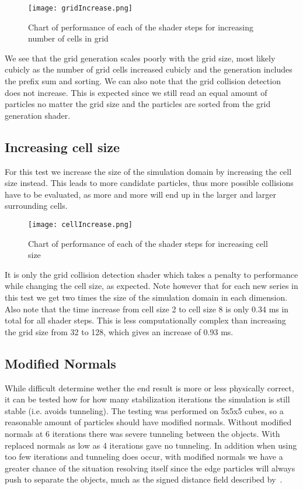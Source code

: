 \begin{figure}[H]
  \centering
  \texttt{[image: gridIncrease.png]}
  \caption{Chart of performance of each of the shader steps for increasing number of cells in grid}
\end{figure}

We see that the grid generation scales poorly with the grid size, most likely cubicly
as the number of grid cells increased cubicly and the generation includes the prefix sum and sorting.
We can also note that the grid collision detection does not increase. This is expected since
we still read an equal amount of particles no matter the grid size and the particles are
sorted from the grid generation shader.

\subsection{Increasing cell size}
For this test we increase the size of the simulation domain by increasing the cell size instead.
This leads to more candidate particles, thus more possible collisions have to be evaluated,
as more and more will end up in
the larger and larger surrounding cells.
\begin{figure}[H]
  \centering
  \texttt{[image: cellIncrease.png]}
  \caption{Chart of performance of each of the shader steps for increasing cell size}
\end{figure}

It is only the grid collision detection shader which takes a penalty to performance
while changing the cell size, as expected. Note however that for each new series
in this test we get two times the size of the simulation domain in each dimension.
Also note that the time increase from cell size 2 to cell size 8 is only 0.34 ms in total for all shader steps.
This is less computationally complex than increasing the grid size from 32 to 128, which gives an increase of 0.93 ms.

\subsection{Modified Normals}\label{sec:resmodnorm}
While difficult determine wether the end result is more or less physically correct,
it can be tested how for how many stabilization iterations the simulation
is still stable (i.e. avoids tunneling). The testing was performed on 5x5x5
cubes, so a reasonable amount of particles should have modified normals. Without modified
normals at 6 iterations there was severe tunneling between the objects. With replaced normals
 as low as 4 iterations gave no tunneling. In addition when using too few iterations
 and tunneling does occur, with modified normals we have a greater chance of the
 situation resolving itself since the edge particles will always push to separate
 the objects, much as the signed distance field described by~\cite{flex}.

